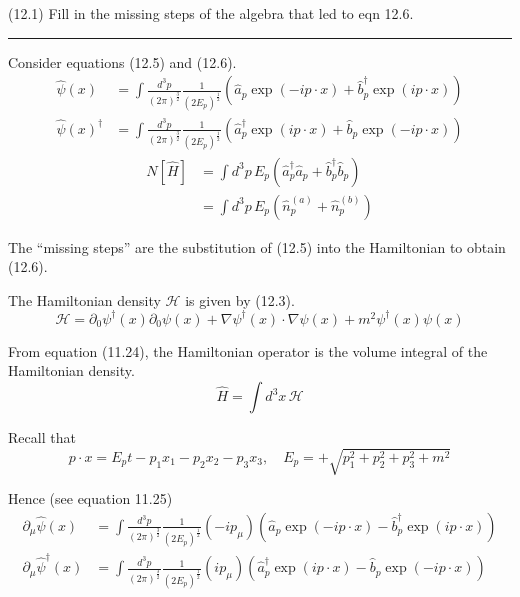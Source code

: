 \documentclass[12pt]{article}
\begin{document}
(12.1)
Fill in the missing steps of the algebra that led to
eqn 12.6.

\bigskip
\hrule

\bigskip
Consider equations (12.5) and (12.6).
\begin{equation*}
\begin{aligned}
\hat\psi(x)&=\int\frac{d^3p}{(2\pi)^\frac{3}{2}}\frac{1}{(2E_p)^\frac{1}{2}}
\left(\hat a_p\exp(-ip\cdot x)+\hat b_p^\dag\exp(ip\cdot x)\right)
\\
\hat\psi(x)^\dag&=\int\frac{d^3p}{(2\pi)^\frac{3}{2}}\frac{1}{(2E_p)^\frac{1}{2}}
\left(\hat a_p^\dag\exp(ip\cdot x)+\hat b_p\exp(-ip\cdot x)\right)
\end{aligned}
\tag{12.5}
\end{equation*}
\begin{equation*}
\begin{aligned}
N[\hat H]&=\int d^3p\,E_p\left(\hat a_p^\dag\hat a_p+\hat b_p^\dag\hat b_p\right)
\\
&=\int d^3p\,E_p\left(\hat n_p^{(a)}+\hat n_p^{(b)}\right)
\end{aligned}
\tag{12.6}
\end{equation*}

The ``missing steps'' are the substitution of (12.5) into the Hamiltonian to obtain (12.6).

\bigskip
The Hamiltonian density $\mathcal H$ is given by (12.3).
\begin{equation*}
\mathcal H=\partial_0\psi^\dag(x)\partial_0\psi(x)+\nabla\psi^\dag(x)\cdot\nabla\psi(x)+m^2\psi^\dag(x)\psi(x)
\tag{12.3}
\end{equation*}

From equation (11.24), the Hamiltonian operator is the volume integral of the Hamiltonian density.
\begin{equation*}
\hat H=\int d^3x\,\mathcal H
\end{equation*}

Recall that
\begin{equation*}
p\cdot x=E_pt-p_1x_1-p_2x_2-p_3x_3,\quad E_p=+\sqrt{p_1^2+p_2^2+p_3^2+m^2}
\end{equation*}

Hence (see equation 11.25)
\begin{equation*}
\begin{aligned}
\partial_\mu\hat\psi(x)
&=\int\frac{d^3p}{(2\pi)^\frac{3}{2}}\frac{1}{(2E_p)^\frac{1}{2}}(-ip_\mu)
\left(\hat a_p\exp(-ip\cdot x)-\hat b_p^\dag\exp(ip\cdot x)\right)
\\
\partial_\mu\hat\psi^\dag(x)
&=\int\frac{d^3p}{(2\pi)^\frac{3}{2}}\frac{1}{(2E_p)^\frac{1}{2}}(ip_\mu)
\left(\hat a_p^\dag\exp(ip\cdot x)-\hat b_p\exp(-ip\cdot x)\right)
\end{aligned}
\end{equation*}
\end{document}
